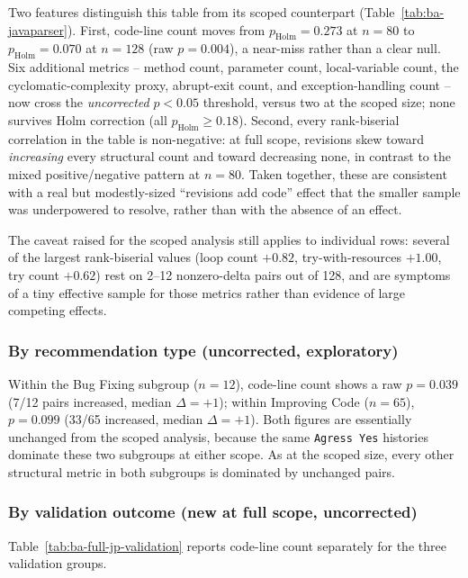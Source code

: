 Two features distinguish this table from its scoped counterpart (Table~\ref{tab:ba-javaparser}).
First, code-line count moves from $p_{\text{Holm}}=0.273$ at $n=80$ to $p_{\text{Holm}}=0.070$ at $n=128$ (raw $p=0.004$), a near-miss rather than a clear null.
Six additional metrics -- method count, parameter count, local-variable count, the cyclomatic-complexity proxy, abrupt-exit count, and exception-handling count -- now cross the \emph{uncorrected} $p<0.05$ threshold, versus two at the scoped size; none survives Holm correction (all $p_{\text{Holm}}\geq0.18$).
Second, every rank-biserial correlation in the table is non-negative: at full scope, revisions skew toward \emph{increasing} every structural count and toward decreasing none, in contrast to the mixed positive/negative pattern at $n=80$.
Taken together, these are consistent with a real but modestly-sized ``revisions add code'' effect that the smaller sample was underpowered to resolve, rather than with the absence of an effect.

The caveat raised for the scoped analysis still applies to individual rows: several of the largest rank-biserial values (loop count $+0.82$, try-with-resources $+1.00$, try count $+0.62$) rest on 2--12 nonzero-delta pairs out of 128, and are symptoms of a tiny effective sample for those metrics rather than evidence of large competing effects.

\subsubsection*{By recommendation type (uncorrected, exploratory)}

Within the Bug Fixing subgroup ($n=12$), code-line count shows a raw $p=0.039$ (7/12 pairs increased, median $\Delta=+1$); within Improving Code ($n=65$), $p=0.099$ (33/65 increased, median $\Delta=+1$).
Both figures are essentially unchanged from the scoped analysis, because the same \texttt{Agress Yes} histories dominate these two subgroups at either scope.
As at the scoped size, every other structural metric in both subgroups is dominated by unchanged pairs.

\subsubsection*{By validation outcome (new at full scope, uncorrected)}

Table~\ref{tab:ba-full-jp-validation} reports code-line count separately for the three validation groups.

